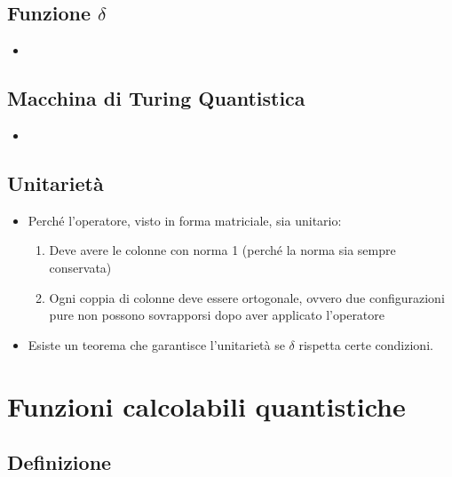 \documentclass{beamer}
\begin{document}
\subsection{Funzione \texorpdfstring{\(\delta\)}{δ}}

\begin{frame}{\subsecname}{}
	\begin{itemize}
		\item
	\end{itemize}
\end{frame}

\subsection{Macchina di Turing Quantistica}

\begin{frame}{\subsecname}{}
	\begin{itemize}
		\item
	\end{itemize}
\end{frame}

\subsection{Unitarietà}

\begin{frame}{\subsecname}{}
	\begin{itemize}
		\item Perché l'operatore, visto in forma matriciale, sia unitario:
		\begin{enumerate}
			\item Deve avere le colonne con norma 1 (perché la norma sia sempre conservata)
			\item Ogni coppia di colonne deve essere ortogonale, ovvero due configurazioni pure non possono sovrapporsi dopo aver applicato l'operatore
		\end{enumerate}
		\item Esiste un teorema che garantisce l'unitarietà se \(\delta\) rispetta certe condizioni.
	\end{itemize}
\end{frame}

\section{Funzioni calcolabili quantistiche}

\subsection{Definizione}
\end{document}
